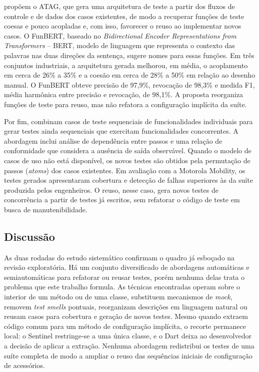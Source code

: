  propõem o ATAG, que gera uma arquitetura de teste a partir dos fluxos de controle e de dados dos casos existentes, de modo a recuperar funções de teste coesas e pouco acopladas e, com isso, favorecer o reuso ao implementar novos casos. O FunBERT, baseado no \textit{Bidirectional Encoder Representations from Transformers} -- BERT, modelo de linguagem que representa o contexto das palavras nas duas direções da sentença, sugere nomes para essas funções. Em três conjuntos industriais, a arquitetura gerada melhorou, em média, o acoplamento em cerca de 26\% a 35\% e a coesão em cerca de 28\% a 50\% em relação ao desenho manual. O FunBERT obteve precisão de 97,9\%, revocação de 98,3\% e medida F1, média harmônica entre precisão e revocação, de 98,1\%. A proposta reorganiza funções de teste para reuso, mas não refatora a configuração implícita da suíte.

Por fim,  combinam casos de teste sequenciais de funcionalidades individuais para gerar testes ainda sequenciais que exercitam funcionalidades concorrentes. A abordagem inclui análise de dependência entre passos e uma relação de conformidade que considera a ausência de saída observável. Quando o modelo de casos de uso não está disponível, os novos testes são obtidos pela permutação de passos (\textit{atoms}) dos casos existentes. Em avaliação com a Motorola Mobility, os testes gerados apresentaram cobertura e detecção de falhas superiores às da suíte produzida pelos engenheiros. O reuso, nesse caso, gera novos testes de concorrência a partir de testes já escritos, sem refatorar o código de teste em busca de manutenibilidade.

\subsection{Discussão}
\label{section:systematic-study-discussion}

As duas rodadas do estudo sistemático confirmam o quadro já esboçado na revisão exploratória. Há um conjunto diversificado de abordagens automáticas e semiautomáticas para refatorar ou reusar testes, porém nenhuma delas trata o problema que este trabalho formula. As técnicas encontradas operam sobre o interior de um método ou de uma classe, substituem mecanismos de \textit{mock}, removem \textit{test smells} pontuais, reorganizam descrições em linguagem natural ou reusam casos para cobertura e geração de novos testes. Mesmo quando extraem código comum para um método de configuração implícita, o recorte permanece local: o Sentinel restringe-se a uma única classe, e o Dart deixa ao desenvolvedor a decisão de aplicar a extração. Nenhuma abordagem redistribui os testes de uma suíte completa de modo a ampliar o reuso das sequências iniciais de configuração de acessórios.

